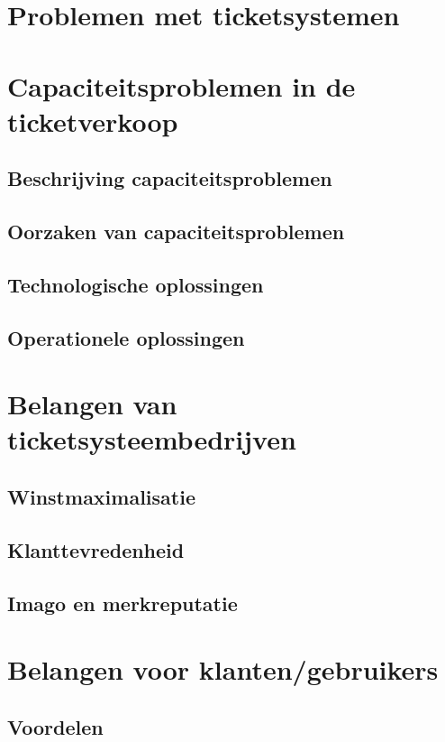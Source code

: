 \documentclass[a4paper,10pt]{article}
\begin{document}
\tableofcontents
\newpage

\section{Problemen met ticketsystemen}
\newpage

\section{Capaciteitsproblemen in de ticketverkoop}
\subsection{Beschrijving capaciteitsproblemen}
\subsection{Oorzaken van capaciteitsproblemen}
\subsection{Technologische oplossingen}
\subsection{Operationele oplossingen}

\section{Belangen van ticketsysteembedrijven}
\subsection{Winstmaximalisatie}
\subsection{Klanttevredenheid}
\subsection{Imago en merkreputatie}

\section{Belangen voor klanten/gebruikers}
\subsection{Voordelen}
\end{document}
